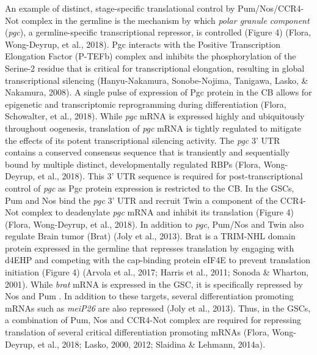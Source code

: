 \documentclass[12pt,oneside]{reedthesis}
\begin{document}
An example of distinct, stage-specific translational control by
Pum/Nos/CCR4-Not complex in the germline is the mechanism by which
\emph{polar granule component} (\emph{pgc}), a germline-specific transcriptional
repressor, is controlled (Figure 4) (Flora, Wong-Deyrup, et al., 2018). Pgc interacts with
the Positive Transcription Elongation Factor (P-TEFb) complex and
inhibits the phosphorylation of the Serine-2 residue that is critical
for transcriptional elongation, resulting in global transcriptional
silencing (Hanyu-Nakamura, Sonobe-Nojima, Tanigawa, Lasko, \& Nakamura, 2008). A single pulse of expression of Pgc
protein in the CB allows for epigenetic and transcriptomic reprogramming
during differentiation (Flora, Schowalter, et al., 2018). While \emph{pgc} mRNA is expressed
highly and ubiquitously throughout oogenesis, translation of \emph{pgc} mRNA
is tightly regulated to mitigate the effects of its potent
transcriptional silencing activity. The \emph{pgc} 3' UTR contains a
conserved consensus sequence that is transiently and sequentially bound
by multiple distinct, developmentally regulated RBPs (Flora, Wong-Deyrup, et al., 2018).
This 3' UTR sequence is required for post-transcriptional control of
\emph{pgc} as Pgc protein expression is restricted to the CB. In the GSCs,
Pum and Nos bind the \emph{pgc} 3' UTR and recruit Twin a component of the
CCR4-Not complex to deadenylate \emph{pgc} mRNA and inhibit its translation
(Figure 4) (Flora, Wong-Deyrup, et al., 2018). In addition to \emph{pgc}, Pum/Nos and Twin also
regulate Brain tumor (Brat) (Joly et al., 2013). Brat is a TRIM-NHL domain
protein expressed in the germline that represses translation by engaging
with d4EHP and competing with the cap-binding protein eIF4E to prevent
translation initiation (Figure 4) (Arvola et al., 2017; Harris et al., 2011; Sonoda \& Wharton, 2001). While \emph{brat} mRNA is expressed in the GSC, it is
specifically repressed by Nos and Pum . In addition to these targets,
several differentiation promoting mRNAs such as \emph{meiP26} are also
repressed (Joly et al., 2013). Thus, in the GSCs, a combination of Pum, Nos
and CCR4-Not complex are required for repressing translation of several
critical differentiation promoting mRNAs (Flora, Wong-Deyrup, et al., 2018; Lasko, 2000, 2012; Slaidina \& Lehmann, 2014a).
\end{document}
